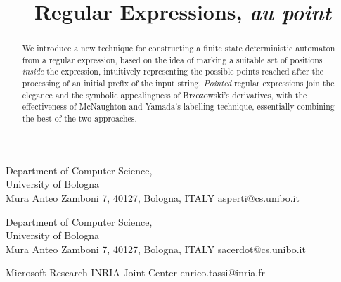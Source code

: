 \documentclass[preprint]{sigplanconf}
\begin{document}
\titlebanner{}   

\title{Regular Expressions, {\em au point}\\}

           {Department of Computer Science, \\
            University of Bologna\\
            Mura Anteo Zamboni 7, 40127, Bologna, ITALY}
           {asperti@cs.unibo.it}

           {Department of Computer Science,\\
	   University of Bologna\\
            Mura Anteo Zamboni 7, 40127, Bologna, ITALY}
           {sacerdot@cs.unibo.it}

           {Microsoft Research-INRIA Joint Center}
           {enrico.tassi@inria.fr}



\maketitle

\begin{abstract}
We introduce a new technique for constructing a finite state 
deterministic automaton from a regular expression, based on the idea 
of marking a suitable set of positions {\em inside} the expression,
intuitively representing the possible points reached after the 
processing of an initial prefix of the 
input string. {\em Pointed} regular expressions
join the elegance and the symbolic appealingness of Brzozowski's
derivatives, with the effectiveness of McNaughton and Yamada's
labelling technique, essentially combining the best of the two 
approaches. 
\end{abstract}



\end{document}

